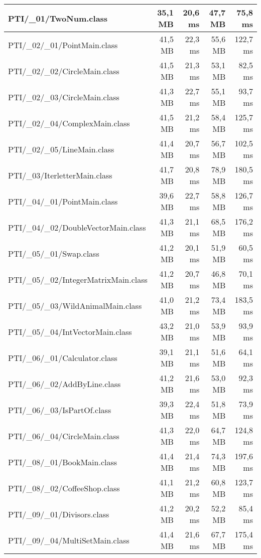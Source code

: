 \begin{center}
\begin{longtable}{ | l | r | r | r | r | }
		\hline
		PTI/\_01/TwoNum.class & 35,1 MB & 20,6 ms & 47,7 MB & 75,8 ms \\
		\hline
		PTI/\_02/\_01/PointMain.class & 41,5 MB & 22,3 ms & 55,6 MB & 122,7 ms \\
		\hline
		PTI/\_02/\_02/CircleMain.class & 41,5 MB & 21,3 ms & 53,1 MB & 82,5 ms \\
		\hline
		PTI/\_02/\_03/CircleMain.class & 41,3 MB & 22,7 ms & 55,1 MB & 93,7 ms \\
		\hline
		PTI/\_02/\_04/ComplexMain.class & 41,5 MB & 21,2 ms & 58,4 MB & 125,7 ms \\
		\hline
		PTI/\_02/\_05/LineMain.class & 41,4 MB & 20,7 ms & 56,7 MB & 102,5 ms \\
		\hline
		PTI/\_03/IterletterMain.class & 41,7 MB & 20,8 ms & 78,9 MB & 180,5 ms \\
		\hline
		PTI/\_04/\_01/PointMain.class & 39,6 MB & 22,7 ms & 58,8 MB & 126,7 ms \\
		\hline
		PTI/\_04/\_02/DoubleVectorMain.class & 41,3 MB & 21,1 ms & 68,5 MB & 176,2 ms \\
		\hline
		PTI/\_05/\_01/Swap.class & 41,2 MB & 20,1 ms & 51,9 MB & 60,5 ms \\
		\hline
		PTI/\_05/\_02/IntegerMatrixMain.class & 41,2 MB & 20,7 ms & 46,8 MB & 70,1 ms \\
		\hline
		PTI/\_05/\_03/WildAnimalMain.class & 41,0 MB & 21,2 ms & 73,4 MB & 183,5 ms \\
		\hline
		PTI/\_05/\_04/IntVectorMain.class & 43,2 MB & 21,0 ms & 53,9 MB & 93,9 ms \\
		\hline
		PTI/\_06/\_01/Calculator.class & 39,1 MB & 21,1 ms & 51,6 MB & 64,1 ms \\
		\hline
		PTI/\_06/\_02/AddByLine.class & 41,2 MB & 21,6 ms & 53,0 MB & 92,3 ms \\
		\hline
		PTI/\_06/\_03/IsPartOf.class & 39,3 MB & 22,4 ms & 51,8 MB & 73,9 ms \\
		\hline
		PTI/\_06/\_04/CircleMain.class & 41,3 MB & 22,0 ms & 64,7 MB & 124,8 ms \\
		\hline
		PTI/\_08/\_01/BookMain.class & 41,4 MB & 21,4 ms & 74,3 MB & 197,6 ms \\
		\hline
		PTI/\_08/\_02/CoffeeShop.class & 41,1 MB & 21,2 ms & 60,8 MB & 123,7 ms \\
		\hline
		PTI/\_09/\_01/Divisors.class & 41,2 MB & 20,2 ms & 52,2 MB & 85,4 ms \\
		\hline
		PTI/\_09/\_04/MultiSetMain.class & 41,4 MB & 21,6 ms & 67,7 MB & 175,4 ms \\

\end{longtable}
\end{center}
